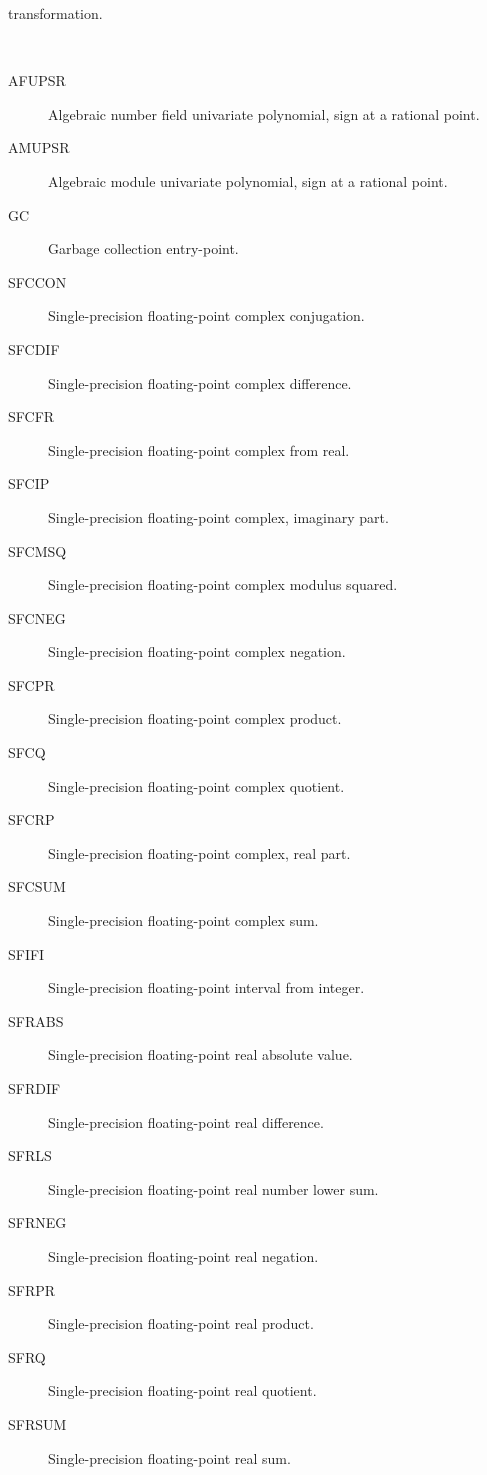 \begin{description}
\begin{description}
    transformation.
  \end{description}
\item[point] \ \ 
  \begin{description}
  \item[AFUPSR]  Algebraic number field univariate polynomial, sign at a
    rational point.
  \item[AMUPSR]  Algebraic module univariate polynomial, sign at a rational
    point.
  \item[GC]  Garbage collection entry-point.
  \item[SFCCON]  Single-precision floating-point complex conjugation.
  \item[SFCDIF]  Single-precision floating-point complex difference.
  \item[SFCFR]  Single-precision floating-point complex from real.
  \item[SFCIP]  Single-precision floating-point complex, imaginary part.
  \item[SFCMSQ]  Single-precision floating-point complex modulus squared.
  \item[SFCNEG]  Single-precision floating-point complex negation.
  \item[SFCPR]  Single-precision floating-point complex product.
  \item[SFCQ]  Single-precision floating-point complex quotient.
  \item[SFCRP]  Single-precision floating-point complex, real part.
  \item[SFCSUM]  Single-precision floating-point complex sum.
  \item[SFIFI]  Single-precision floating-point interval from integer.
  \item[SFRABS]  Single-precision floating-point real absolute value.
  \item[SFRDIF]  Single-precision floating-point real difference.
  \item[SFRLS]  Single-precision floating-point real number lower sum.
  \item[SFRNEG]  Single-precision floating-point real negation.
  \item[SFRPR]  Single-precision floating-point real product.
  \item[SFRQ]  Single-precision floating-point real quotient.
  \item[SFRSUM]  Single-precision floating-point real sum.
  \end{description}
\item[pointer] \ \ 
  \begin{description}

\end{description}
\end{description}
